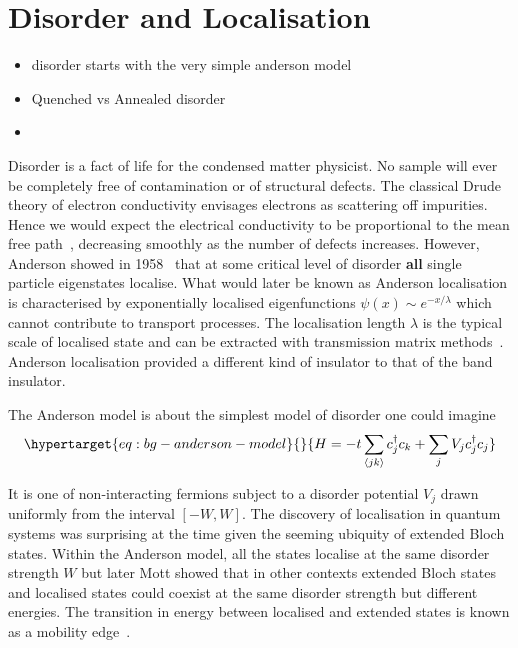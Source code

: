\hypertarget{bg-disorder-and-localisation}{%
\section{Disorder and Localisation}\label{bg-disorder-and-localisation}}

\begin{itemize}
\item
  disorder starts with the very simple anderson model
\item
  Quenched vs Annealed disorder
\item
\end{itemize}

Disorder is a fact of life for the condensed matter physicist. No sample will ever be completely free of contamination or of structural defects. The classical Drude theory of electron conductivity envisages electrons as scattering off impurities. Hence we would expect the electrical conductivity to be proportional to the mean free path~\autocite{lagendijkFiftyYearsAnderson2009}, decreasing smoothly as the number of defects increases. However, Anderson showed in 1958~\autocite{andersonAbsenceDiffusionCertain1958} that at some critical level of disorder \textbf{all} single particle eigenstates localise. What would later be known as Anderson localisation is characterised by exponentially localised eigenfunctions \(\psi(x) \sim e^{-x/\lambda}\) which cannot contribute to transport processes. The localisation length \(\lambda\) is the typical scale of localised state and can be extracted with transmission matrix methods~\autocite{pendrySymmetryTransportWaves1994}. Anderson localisation provided a different kind of insulator to that of the band insulator.

The Anderson model is about the simplest model of disorder one could imagine \begin{equation}\protect\hypertarget{eq:bg-anderson-model}{}{
H = -t\sum_{\langle jk \rangle} c^\dagger_j c_k + \sum_j V_j c_j^\dagger c_j
}\label{eq:bg-anderson-model}\end{equation}

It is one of non-interacting fermions subject to a disorder potential \(V_j\) drawn uniformly from the interval \([-W,W]\). The discovery of localisation in quantum systems was surprising at the time given the seeming ubiquity of extended Bloch states. Within the Anderson model, all the states localise at the same disorder strength \(W\) but later Mott showed that in other contexts extended Bloch states and localised states could coexist at the same disorder strength but different energies. The transition in energy between localised and extended states is known as a mobility edge~\autocite{mottMetalInsulatorTransitions1978}.

